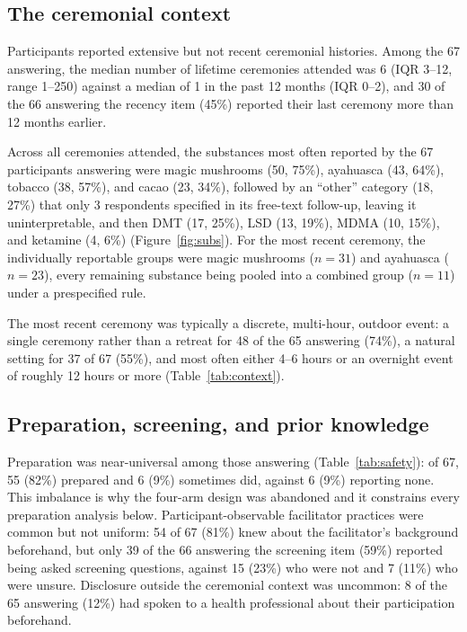 \documentclass[12pt]{article}
\begin{document}
\subsection{The ceremonial context}

Participants reported extensive but not recent ceremonial histories. Among the 67 answering, the median
number of lifetime ceremonies attended was 6 (IQR 3--12, range 1--250) against a median of 1 in the past 12
months (IQR 0--2), and 30 of the 66 answering the recency item (45\%) reported their last ceremony more
than 12 months earlier.

Across all ceremonies attended, the substances most often reported by the 67 participants answering were
magic mushrooms (50, 75\%), ayahuasca (43, 64\%), tobacco (38, 57\%), and cacao (23, 34\%), followed by an
``other'' category (18, 27\%) that only 3 respondents specified in its free-text follow-up, leaving it
uninterpretable, and then DMT (17, 25\%), LSD (13, 19\%), MDMA (10, 15\%), and ketamine (4, 6\%)
(Figure~\ref{fig:subs}). For the most recent ceremony, the individually reportable groups were magic
mushrooms ($n=31$) and ayahuasca ($n=23$), every remaining substance being pooled into a combined group
($n=11$) under a prespecified rule.

The most recent ceremony was typically a discrete, multi-hour, outdoor event: a single ceremony rather than
a retreat for 48 of the 65 answering (74\%), a natural setting for 37 of 67 (55\%), and most often either
4--6 hours or an overnight event of roughly 12 hours or more (Table~\ref{tab:context}).

\subsection{Preparation, screening, and prior knowledge}

Preparation was near-universal among those answering (Table~\ref{tab:safety}): of 67, 55 (82\%) prepared
and 6 (9\%) sometimes did, against 6 (9\%) reporting none. This imbalance is why the four-arm design was
abandoned and it constrains every preparation analysis below. Participant-observable facilitator practices
were common but not uniform: 54 of 67 (81\%) knew about the facilitator's background beforehand, but only
39 of the 66 answering the screening item (59\%) reported being asked screening questions, against 15
(23\%) who were not and 7 (11\%) who were unsure. Disclosure outside the ceremonial context was uncommon:
8 of the 65 answering (12\%) had spoken to a health professional about their participation beforehand.
\end{document}
